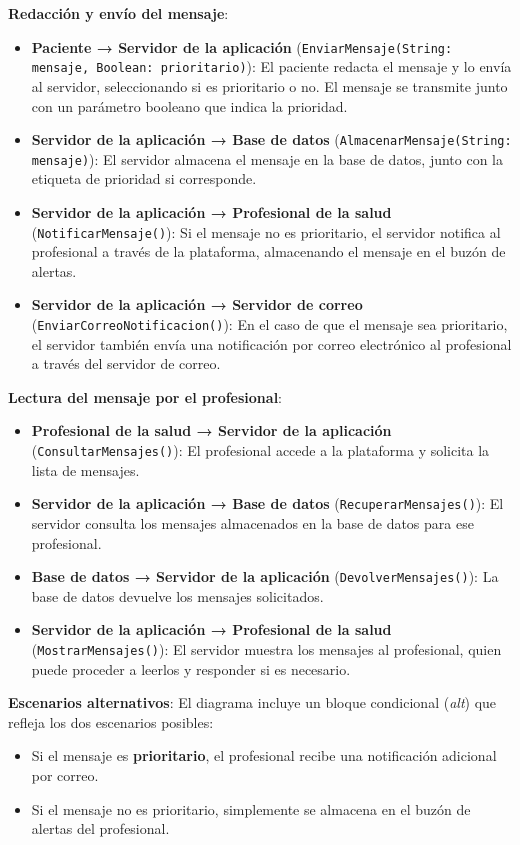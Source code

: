 \documentclass{article}
\begin{document}
\textbf{Redacción y envío del mensaje}:
\begin{itemize}
	\item \textbf{Paciente → Servidor de la aplicación} (\texttt{EnviarMensaje(String: mensaje, Boolean: prioritario)}): El paciente redacta el mensaje y lo envía al servidor, seleccionando si es prioritario o no. El mensaje se transmite junto con un parámetro booleano que indica la prioridad.
	\item \textbf{Servidor de la aplicación → Base de datos} (\texttt{AlmacenarMensaje(String: mensaje)}): El servidor almacena el mensaje en la base de datos, junto con la etiqueta de prioridad si corresponde.
	\item \textbf{Servidor de la aplicación → Profesional de la salud} (\texttt{NotificarMensaje()}): Si el mensaje no es prioritario, el servidor notifica al profesional a través de la plataforma, almacenando el mensaje en el buzón de alertas.
	\item \textbf{Servidor de la aplicación → Servidor de correo} (\texttt{EnviarCorreoNotificacion()}): En el caso de que el mensaje sea prioritario, el servidor también envía una notificación por correo electrónico al profesional a través del servidor de correo.
\end{itemize}

\textbf{Lectura del mensaje por el profesional}:
\begin{itemize}
	\item \textbf{Profesional de la salud → Servidor de la aplicación} (\texttt{ConsultarMensajes()}): El profesional accede a la plataforma y solicita la lista de mensajes.
	\item \textbf{Servidor de la aplicación → Base de datos} (\texttt{RecuperarMensajes()}): El servidor consulta los mensajes almacenados en la base de datos para ese profesional.
	\item \textbf{Base de datos → Servidor de la aplicación} (\texttt{DevolverMensajes()}): La base de datos devuelve los mensajes solicitados.
	\item \textbf{Servidor de la aplicación → Profesional de la salud} (\texttt{MostrarMensajes()}): El servidor muestra los mensajes al profesional, quien puede proceder a leerlos y responder si es necesario.
\end{itemize}

\textbf{Escenarios alternativos}:
El diagrama incluye un bloque condicional (\textit{alt}) que refleja los dos escenarios posibles:
\begin{itemize}
	\item Si el mensaje es \textbf{prioritario}, el profesional recibe una notificación adicional por correo.
	\item Si el mensaje no es prioritario, simplemente se almacena en el buzón de alertas del profesional.
\end{itemize}
\end{document}
